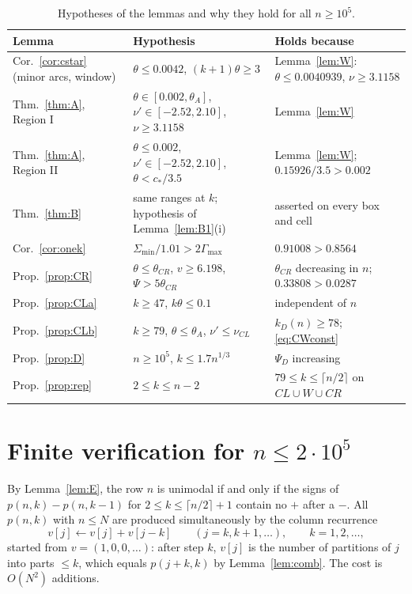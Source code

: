\documentclass[11pt]{amsart}
\theoremstyle{definition}
\theoremstyle{remark}
\numberwithin{equation}{section}
\begin{document}
\begin{table}[ht]
\caption{Hypotheses of the lemmas and why they hold for all $n\ge10^5$.}\label{tab:thresholds}
\small
\begin{tabular}{@{}>{\raggedright\arraybackslash}p{}>{\raggedright\arraybackslash}p{}>{\raggedright\arraybackslash}p{}@{}}
\toprule
Lemma & Hypothesis & Holds because \\
\midrule
Cor.~\ref{cor:cstar} (minor arcs, window) & $\theta\le0.0042$, $(k+1)\theta\ge3$ & Lemma~\ref{lem:W}: $\theta\le0.0040939$, $\nu\ge3.1158$ \\
Thm.~\ref{thm:A}, Region I & $\theta\in[0.002,\theta_A]$, $\nu'\in[-2.52,2.10]$, $\nu\ge3.1158$ & Lemma~\ref{lem:W} \\
Thm.~\ref{thm:A}, Region II & $\theta\le0.002$, $\nu'\in[-2.52,2.10]$, $\theta<c_\ast/3.5$ & Lemma~\ref{lem:W}; $0.15926/3.5>0.002$ \\
Thm.~\ref{thm:B} & same ranges at $k$; hypothesis of Lemma~\ref{lem:B1}(i) & asserted on every box and cell \\
Cor.~\ref{cor:onek} & $\Sigma_{\min}/1.01>2\Gamma_{\max}$ & $0.91008>0.8564$ \\
Prop.~\ref{prop:CR} & $\theta\le\theta_{CR}$, $v\ge6.198$, $\Psi>5\theta_{CR}$ & $\theta_{CR}$ decreasing in $n$; $0.33808>0.0287$ \\
Prop.~\ref{prop:CLa} & $k\ge47$, $k\theta\le0.1$ & independent of $n$ \\
Prop.~\ref{prop:CLb} & $k\ge79$, $\theta\le\theta_A$, $\nu'\le\nu_{CL}$ & $k_D(n)\ge78$; \eqref{eq:CWconst} \\
Prop.~\ref{prop:D} & $n\ge10^5$, $k\le1.7n^{1/3}$ & $\Psi_D$ increasing \\
Prop.~\ref{prop:rep} & $2\le k\le n-2$ & $79\le k\le\lceil n/2\rceil$ on $CL\cup W\cup CR$ \\
\bottomrule
\end{tabular}
\end{table}

\section{Finite verification for \texorpdfstring{$n\le2\cdot10^5$}{n <= 2*10\^5}}\label{sec:finite}

By Lemma~\ref{lem:E}, the row $n$ is unimodal if and only if the signs of $p(n,k)-p(n,k-1)$ for $2\le k\le\lceil n/2\rceil+1$ contain no
$+$ after a $-$. All $p(n,k)$ with $n\le N$ are produced simultaneously by the column recurrence
\[
  v[j]\leftarrow v[j]+v[j-k]\qquad(j=k,k+1,\dots),\qquad k=1,2,\dots,
\]
started from $v=(1,0,0,\dots)$: after step $k$, $v[j]$ is the number of partitions of $j$ into parts $\le k$, which equals $p(j+k,k)$
by Lemma~\ref{lem:comb}. The cost is $O(N^2)$ additions.
\end{document}

